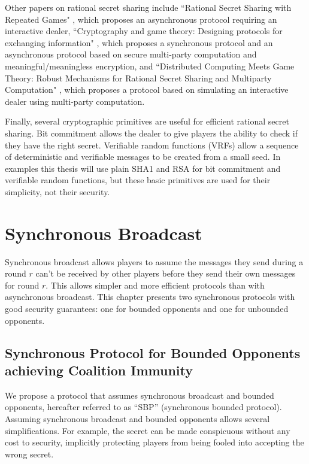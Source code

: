 \documentclass{dalcsthesis}
\begin{document}
Other papers on rational secret sharing include ``Rational Secret Sharing with Repeated Games" \cite{maleka08}, which proposes an asynchronous protocol requiring an interactive dealer, ``Cryptography and game theory: Designing protocols for exchanging information" \cite{kol08-2}, which proposes a synchronous protocol and an asynchronous protocol based on secure multi-party computation and meaningful/meaningless encryption, and ``Distributed Computing Meets Game Theory: Robust Mechanisms for Rational Secret Sharing and Multiparty Computation" \cite{abraham06}, which proposes a protocol based on simulating an interactive dealer using multi-party computation.

Finally, several cryptographic primitives are useful for efficient rational secret sharing. Bit commitment \cite{naor91} allows the dealer to give players the ability to check if they have the right secret. Verifiable random functions (VRFs) \cite{micali99, dis05} allow a sequence of deterministic and verifiable messages to be created from a small seed. In examples this thesis will use plain SHA1 and RSA for bit commitment and verifiable random functions, but these basic primitives are used for their simplicity, not their security.




\chapter{Synchronous Broadcast}
\label{chapter:Synchronous}

Synchronous broadcast allows players to assume the messages they send during a round $r$ can't be received by other players before they send their own messages for round $r$. This allows simpler and more efficient protocols than with asynchronous broadcast. This chapter presents two synchronous protocols with good security guarantees: one for bounded opponents and one for unbounded opponents.



\section{Synchronous Protocol for Bounded Opponents achieving Coalition Immunity}

We propose a protocol that assumes synchronous broadcast and bounded opponents, hereafter referred to as ``SBP'' (synchronous bounded protocol). Assuming synchronous broadcast and bounded opponents allows several simplifications. For example, the secret can be made conspicuous without any cost to security, implicitly protecting players from being fooled into accepting the wrong secret.
\end{document}
